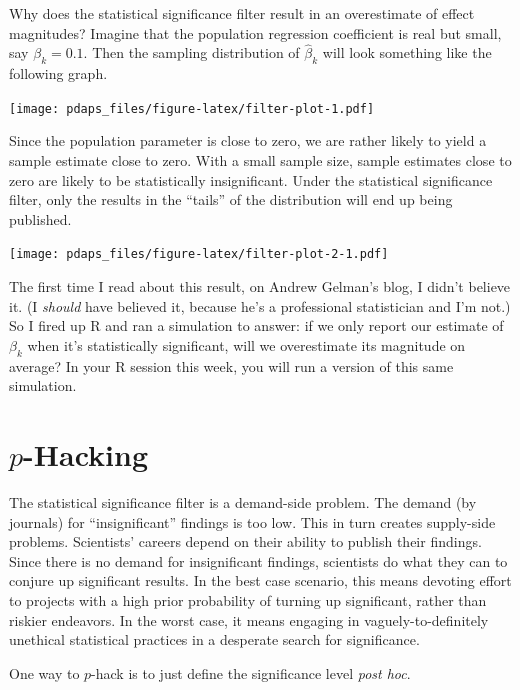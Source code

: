 \documentclass[12pt,oneside,openany]{book}
\begin{document}
Why does the statistical significance filter result in an overestimate
of effect magnitudes? Imagine that the population regression coefficient
is real but small, say \(\beta_k = 0.1\). Then the sampling distribution
of \(\hat{\beta}_k\) will look something like the following graph.

\texttt{[image: pdaps\_files/figure-latex/filter-plot-1.pdf]}

Since the population parameter is close to zero, we are rather likely to
yield a sample estimate close to zero. With a small sample size, sample
estimates close to zero are likely to be statistically insignificant.
Under the statistical significance filter, only the results in the
``tails'' of the distribution will end up being published.

\texttt{[image: pdaps\_files/figure-latex/filter-plot-2-1.pdf]}

The first time I read about this result, on Andrew Gelman's blog, I
didn't believe it. (I \emph{should} have believed it, because he's a
professional statistician and I'm not.) So I fired up R and ran a
simulation to answer: if we only report our estimate of \(\beta_k\) when
it's statistically significant, will we overestimate its magnitude on
average? In your R session this week, you will run a version of this
same simulation.

\section{\texorpdfstring{\(p\)-Hacking}{p-Hacking}}\label{p-hacking}

The statistical significance filter is a demand-side problem. The demand
(by journals) for ``insignificant'' findings is too low. This in turn
creates supply-side problems. Scientists' careers depend on their
ability to publish their findings. Since there is no demand for
insignificant findings, scientists do what they can to conjure up
significant results. In the best case scenario, this means devoting
effort to projects with a high prior probability of turning up
significant, rather than riskier endeavors. In the worst case, it means
engaging in vaguely-to-definitely unethical statistical practices in a
desperate search for significance.

One way to \(p\)-hack is to just define the significance level
\emph{post hoc}.
\end{document}
